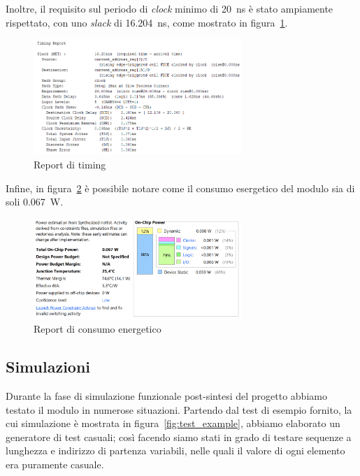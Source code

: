 \documentclass[12pt]{article}
\begin{document}
Inoltre, il requisito sul periodo di \textit{clock} minimo di \qty{20}{\nano\second} è stato ampiamente rispettato, con uno \textit{slack} di \qty{16.204}{\nano\second}, come mostrato in figura~\ref{fig:timing}.

\begin{figure}[ht]
    \centering
    \includegraphics[width=0.7\textwidth]{timing_report.png}
    \caption{Report di timing}\label{fig:timing}
\end{figure}

Infine, in figura~\ref{fig:power} è possibile notare come il consumo esergetico del modulo sia di soli \qty{0.067}{\watt}.

\begin{figure}[ht]
    \centering
    \includegraphics[width=0.7\textwidth]{power_report.png}
    \caption{Report di consumo energetico}\label{fig:power}
\end{figure}

\subsection{Simulazioni}

Durante la fase di simulazione funzionale post-sintesi del progetto abbiamo testato il modulo in numerose situazioni.
Partendo dal test di esempio fornito, la cui simulazione è mostrata in figura~\ref{fig:test_example}, abbiamo elaborato un generatore di test casuali; così facendo siamo stati in grado di testare sequenze a lunghezza e indirizzo di partenza variabili, nelle quali il valore di ogni elemento era puramente casuale.
\end{document}
